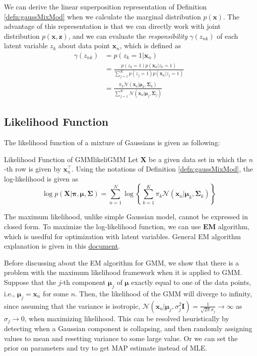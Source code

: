 \documentclass{article}
\begin{document}
        We can derive the linear superposition representation of Definition \ref{defn:gaussMixMod} when we calculate the marginal distribution $p(\textbf{x})$.
        The advantage of this representation is that we can directly work with joint distribution $p(\textbf{x}, \textbf{z})$, and we can evaluate the \emph{responsibility} $\gamma(z_{nk})$ of 
        each latent variable $z_k$ about data point $\textbf{x}_n$, which is defined as
        \begin{align*}
        \gamma(z_{nk})&=p(z_k=1|\textbf{x}_n) \\
        &=\frac{p(z_k=1)p(\textbf{x}_n|z_k=1)}{\sum_{j=1}^{K}p(z_j=1)p(\textbf{x}_n|z_j=1)} \\
        &=\frac{\pi_k\mathcal{N}(\textbf{x}_n|\bm\mu_k,\bm\Sigma_k)}{\sum_{j=1}^{K}\mathcal{N}(\textbf{x}_n|\bm\mu_j,\bm\Sigma_j)}
        \end{align*}
    
    \subsection{Likelihood Function}
        The likelihood function of a mixture of Gaussians is given as following:
        \begin{thm}{Likelihood Function of GMM}{likeliGMM}
            Let \textbf{X} be a given data set in which the $n$-th row is given by $\textbf{x}_n^{\top}$. Using the notations of Definition \ref{defn:gaussMixMod}, the log-likelihood is given as
            \[
            \log{p(\textbf{X}|\bm\pi,\bm\mu,\bm\Sigma)}=\sum_{n=1}^{N}\log{\left\{ \sum_{k=1}^{K}\pi_k\mathcal{N}(\textbf{x}_n|\bm\mu_k,\bm\Sigma_k) \right\}}
            \]
        \end{thm}
        The maximum likelihood, unlike simple Gaussian model, cannot be expressed in closed form. To maximize the log-likelihood function, we can use \textbf{EM} algorithm, which is usedful for
        optimization with latent variables. General EM algorithm explanation is given in this \href{run:../../inference/em_algorithm/em_algorithm.pdf}{document}.

        Before discussing about the EM algorithm for GMM, we show that there is a problem with the maximum likelihood framework when it is applied to GMM.
        Suppose that the $j$-th component $\bm\mu_j$ of $\bm\mu$ exactly equal to one of the data points, i.e., $\bm\mu_j=\textbf{x}_n$ for some $n$. Then, the
        likelihood of the GMM will diverge to infinity, since assuming that the variance is isotropic,
        $\mathcal{N}(\textbf{x}_n|\bm\mu_j, \sigma_j^2\textbf{I})=\frac{1}{\sqrt{2\pi}\sigma_j} \rightarrow \infty$ as $\sigma_j \rightarrow 0$, when maximizing
        likelihood. This can be resolved heuristically by detecting when a Gaussian component is collapsing, and then randomly assigning values to mean and resetting variance to some large value.
        Or we can set the prior on parameters and try to get MAP estimate instead of MLE.
\end{document}
